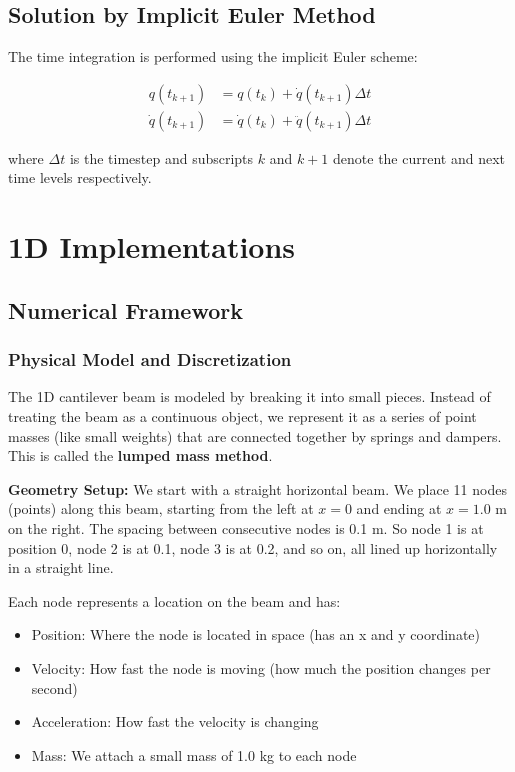 \documentclass[11pt]{article}
\begin{document}
\subsection{Solution by Implicit Euler Method}
\label{sec:orga29a870}

The time integration is performed using the implicit Euler scheme:

\begin{align*}
q(t_{k+1}) &= q(t_k) + \dot{q}(t_{k+1}) \Delta t \\
\dot{q}(t_{k+1}) &= \dot{q}(t_k) + \ddot{q}(t_{k+1}) \Delta t
\end{align*}

where \(\Delta t\) is the timestep and subscripts \(k\) and \(k+1\) denote the current and next time levels respectively.
\section{1D Implementations}
\label{sec:orgfe6b5af}

\subsection{Numerical Framework}
\label{sec:org605da5c}

\subsubsection{Physical Model and Discretization}
\label{sec:org07b2fcf}

The 1D cantilever beam is modeled by breaking it into small pieces. Instead of treating the beam as a continuous object, we represent it as a series of point masses (like small weights) that are connected together by springs and dampers. This is called the \textbf{lumped mass method}.

\textbf{Geometry Setup:}
We start with a straight horizontal beam. We place 11 nodes (points) along this beam, starting from the left at \(x=0\) and ending at \(x=1.0\) m on the right. The spacing between consecutive nodes is 0.1 m. So node 1 is at position 0, node 2 is at 0.1, node 3 is at 0.2, and so on, all lined up horizontally in a straight line.

Each node represents a location on the beam and has:
\begin{itemize}
\item Position: Where the node is located in space (has an x and y coordinate)
\item Velocity: How fast the node is moving (how much the position changes per second)
\item Acceleration: How fast the velocity is changing
\item Mass: We attach a small mass of 1.0 kg to each node
\end{itemize}
\end{document}
